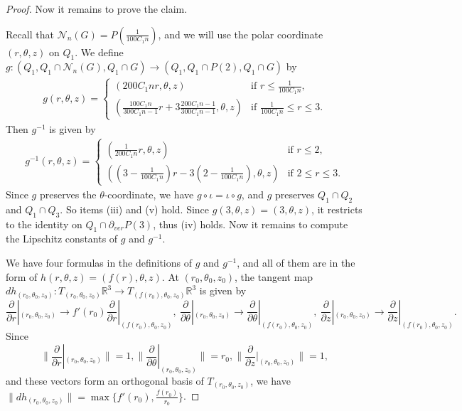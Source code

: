 \documentclass{amsart}
\begin{document}
\begin{proof}


Now it remains to prove the claim.

 Recall that $\mathcal{N}_n(G)=P(\frac{1}{100C_1n})$, and we will use the polar coordinate $(r,\theta,z)$ on $Q_1$. We define $g:(Q_1,Q_1\cap \mathcal{N}_n(G),Q_1\cap G)\to  (Q_1,Q_1\cap P(2), Q_1\cap G)$ by
\begin{equation*}
\begin{aligned}
g(r,\theta,z)=
\begin{cases}
(200C_1n r,\theta,z)& \text{if\ }r\leq \frac{1}{100C_1n},\\
(\frac{100C_1n}{300C_1n-1}r+3\frac{200C_1n-1}{300C_1n-1},\theta,z) & \text{if\ } \frac{1}{100C_1n}\leq r\leq 3.
\end{cases}
\end{aligned}
\end{equation*}
Then $g^{-1}$ is given by 
\begin{equation*}
\begin{aligned}
g^{-1}(r,\theta,z)=
\begin{cases}
(\frac{1}{200C_1n} r,\theta,z)& \text{if\ }r\leq 2,\\
((3-\frac{1}{100C_1n})r-3(2-\frac{1}{100C_1n}),\theta,z) & \text{if\ } 2\leq r\leq 3.
\end{cases}
\end{aligned}
\end{equation*}
Since $g$ preserves the $\theta$-coordinate, we have $g\circ \iota=\iota\circ g$, and $g$ preserves $Q_1\cap Q_2$ and $Q_1\cap Q_3$.  So items (iii) and (v) hold. Since $g(3,\theta,z)=(3,\theta,z)$, it restricts to the identity on $Q_1\cap \partial_{ver}P(3)$, thus (iv) holds. Now it remains to compute the Lipschitz constants of $g$ and $g^{-1}$.

We have four formulas in the definitions of $g$ and $g^{-1}$, and all of them are in the form of $h(r,\theta,z)= (f(r),\theta,z)$. At $(r_0,\theta_0,z_0)$, the tangent map $dh_{(r_0,\theta_0,z_0)}:T_{(r_0,\theta_0,z_0)}\mathbb{R}^3\to T_{(f(r_0),\theta_0,z_0)} \mathbb{R}^3$ is given by 
$$\frac{\partial }{\partial r}|_{(r_0,\theta_0,z_0)}\to f'(r_0)\frac{\partial }{\partial r}|_{(f(r_0),\theta_0,z_0)},\ \frac{\partial }{\partial \theta}|_{(r_0,\theta_0,z_0)}\to \frac{\partial }{\partial \theta}|_{(f(r_0),\theta_0,z_0)},\ \frac{\partial }{\partial z}|_{(r_0,\theta_0,z_0)}\to \frac{\partial }{\partial z}|_{(f(r_0),\theta_0,z_0)}.$$ 
Since $$\|\frac{\partial }{\partial r}|_{(r_0,\theta_0,z_0)}\|=1, \|\frac{\partial }{\partial \theta}|_{(r_0,\theta_0,z_0)}\|=r_0, \|\frac{\partial }{\partial z}|_{(r_0,\theta_0,z_0)}\|=1,$$ and these vectors form an orthogonal basis of $T_{(r_0,\theta_0,z_0)}$, we have $\|dh_{(r_0,\theta_0,z_0)}\|=\max{\{f'(r_0),\frac{f(r_0)}{r_0}\}}$.


\end{proof}
\end{document}
